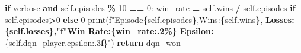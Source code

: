 \documentclass[12pt]{article}
\newenvironment{Shaded}{\begin{snugshade}}{\end{snugshade}}
\newcommand{\BuiltInTok}[1]{#1}
\newcommand{\ControlFlowTok}[1]{\textcolor[rgb]{0.13,0.29,0.53}{\textbf{#1}}}
\newcommand{\DecValTok}[1]{\textcolor[rgb]{0.00,0.00,0.81}{#1}}
\newcommand{\ErrorTok}[1]{\textcolor[rgb]{0.64,0.00,0.00}{\textbf{#1}}}
\newcommand{\FloatTok}[1]{\textcolor[rgb]{0.00,0.00,0.81}{#1}}
\newcommand{\KeywordTok}[1]{\textcolor[rgb]{0.13,0.29,0.53}{\textbf{#1}}}
\newcommand{\NormalTok}[1]{#1}
\newcommand{\OperatorTok}[1]{\textcolor[rgb]{0.81,0.36,0.00}{\textbf{#1}}}
\newcommand{\SpecialCharTok}[1]{\textcolor[rgb]{0.81,0.36,0.00}{\textbf{#1}}}
\newcommand{\SpecialStringTok}[1]{\textcolor[rgb]{0.31,0.60,0.02}{#1}}
\newcommand{\StringTok}[1]{\textcolor[rgb]{0.31,0.60,0.02}{#1}}
\newcommand{\VariableTok}[1]{\textcolor[rgb]{0.00,0.00,0.00}{#1}}
\begin{document}
\begin{thesis}
\begin{Shaded}
\begin{Highlighting}[]
        \ControlFlowTok{if}\NormalTok{ verbose }\KeywordTok{and} \VariableTok{self}\NormalTok{.episodes }\OperatorTok{\%} \DecValTok{10} \OperatorTok{==} \DecValTok{0}\NormalTok{:}
\NormalTok{            win\_rate }\OperatorTok{=} \VariableTok{self}\NormalTok{.wins }\OperatorTok{/} \VariableTok{self}\NormalTok{.episodes }\ControlFlowTok{if} \VariableTok{self}\NormalTok{.episodes}\OperatorTok{\textgreater{}}\DecValTok{0} \ControlFlowTok{else} \DecValTok{0}
            \BuiltInTok{print}\NormalTok{(}\SpecialStringTok{f"Episode}\SpecialCharTok{\{}\VariableTok{self}\SpecialCharTok{.}\NormalTok{episodes}\SpecialCharTok{\}}\SpecialStringTok{,Wins:}\SpecialCharTok{\{}\VariableTok{self}\SpecialCharTok{.}\NormalTok{wins}\SpecialCharTok{\}}\SpecialStringTok{,}
\ErrorTok{            Losses:\{self.losses\},"f"Win Rate:\{win\_rate:.2\%\} Epsilon:}
\NormalTok{            \{}\VariableTok{self}\NormalTok{.dqn\_player.epsilon:}\FloatTok{.3}\ErrorTok{f}\NormalTok{\}}\StringTok{")}
\ErrorTok{        }
        \ControlFlowTok{return}\NormalTok{ dqn\_won}
\end{Highlighting}
\end{Shaded}


\end{thesis}
\end{document}
